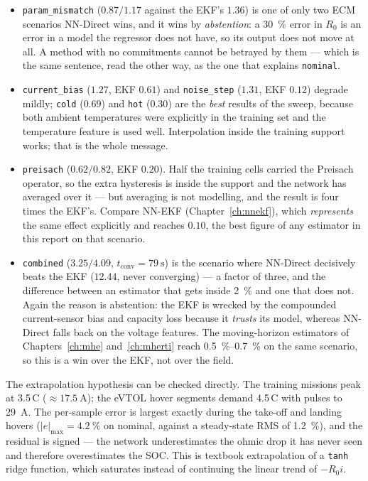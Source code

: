 \begin{itemize}
  \item \texttt{param\_mismatch} ($0.87/1.17$ against the EKF's $1.36$) is one of only two ECM
        scenarios NN-Direct wins, and it wins by \emph{abstention}: a \SI{30}{\percent} error in
        $R_0$ is an error in a model the regressor does not have, so its output does not move at
        all.  A method with no commitments cannot be betrayed by them --- which is the same
        sentence, read the other way, as the one that explains \texttt{nominal}.
  \item \texttt{current\_bias} ($1.27$, EKF $0.61$) and \texttt{noise\_step} ($1.31$, EKF $0.12$)
        degrade mildly; \texttt{cold} ($0.69$) and \texttt{hot} ($0.30$) are the \emph{best} results
        of the sweep, because both ambient temperatures were explicitly in the training set and the
        temperature feature is used well.  Interpolation inside the training support works; that is
        the whole message.
  \item \texttt{preisach} ($0.62/0.82$, EKF $0.20$).  Half the training cells carried the Preisach
        operator, so the extra hysteresis is inside the support and the network has averaged over
        it --- but averaging is not modelling, and the result is four times the EKF's.  Compare
        NN-EKF (Chapter~\ref{ch:nnekf}), which \emph{represents} the same effect explicitly and
        reaches $0.10$, the best figure of any estimator in this report on that scenario.
  \item \texttt{combined} ($3.25/4.09$, $t_\text{conv} = \SI{79}{\second}$) is the scenario where
        NN-Direct decisively beats the EKF ($12.44$, never converging) --- a factor of three, and
        the difference between an estimator that gets inside \SI{2}{\percent} and one that does
        not.  Again the reason is abstention: the EKF is wrecked by the compounded current-sensor
        bias and capacity loss because it \emph{trusts} its model, whereas NN-Direct falls back on
        the voltage features.  The moving-horizon estimators of
        Chapters~\ref{ch:mhe} and~\ref{ch:mherti} reach \SIrange{0.5}{0.7}{\percent} on the same
        scenario, so this is a win over the EKF, not over the field.
\end{itemize}

The extrapolation hypothesis can be checked directly.  The training missions peak at
3.5\,C ($\approx\SI{17.5}{\ampere}$); the eVTOL hover segments demand 4.5\,C
with pulses to \SI{29}{\ampere}.  The per-sample error is largest exactly during the
take-off and landing hovers ($|e|_{\max} = \SI{4.2}{\percent}$ on nominal, against a steady-state
RMS of \SI{1.2}{\percent}), and the residual is signed --- the network underestimates the ohmic
drop it has never seen and therefore overestimates the SOC.  This is textbook extrapolation of a
\texttt{tanh} ridge function, which saturates instead of continuing the linear trend of $-R_0 i$.

